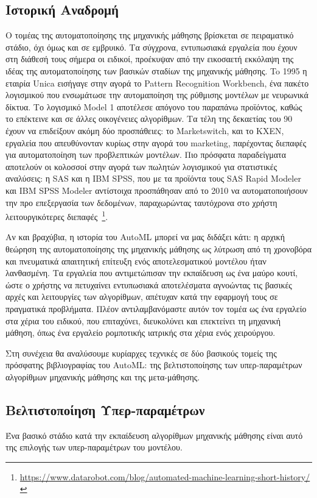  \subsection{Ιστορική Αναδρομή} \label{section:autohistory}
 Ο τομέας της αυτοματοποίησης της μηχανικής μάθησης βρίσκεται σε πειραματικό στάδιο, όχι όμως και σε εμβρυικό. Τα σύγχρονα, εντυπωσιακά εργαλεία που έχουν στη διάθεσή τους σήμερα οι ειδικοί, προέκυψαν από την εικοσαετή εκκόλαψη της ιδέας της αυτοματοποίησης των βασικών σταδίων της μηχανικής μάθησης. To 1995 η εταιρία Unica εισήγαγε στην αγορά το Pattern Recognition Workbench, ένα πακέτο λογισμικού
 που ενσωμάτωσε την αυτομαποίηση της ρύθμισης μοντέλων με νευρωνικά δίκτυα. Το λογισμικό Model 1 αποτέλεσε απόγονο του παραπάνω προϊόντος, καθώς το επέκτεινε και σε άλλες οικογένειες αλγορίθμων. Τα τέλη της δεκαετίας του 90 έχουν να επιδείξουν ακόμη δύο προσπάθειες: το Marketswitch, και το KXEN, εργαλεία που απευθύνονταν κυρίως στην αγορά του marketing, παρέχοντας διεπαφές για αυτοματοποίηση των προβλεπτικών μοντέλων. Πιο πρόσφατα παραδείγματα αποτελούν οι κολοσσοί στην αγορά των πωλητών λογισμικού για στατιστικές αναλύσεις: η SAS και η IBM SPSS, που με τα προϊόντα τους SAS Rapid Modeler και IBM SPSS Modeler αντίστοιχα προσπάθησαν από το 2010 να αυτοματοποιήσουν την προ επεξεργασία των δεδομένων, παραχωρώντας ταυτόχρονα στο χρήστη λειτουργικότερες διεπαφές~\footnote{\url{https://www.datarobot.com/blog/automated-machine-learning-short-history/}}.
 
 Αν και βραχύβια, η ιστορία του AutoML μπορεί να μας διδάξει κάτι: η αρχική θεώρηση της αυτοματοποίησης της μηχανικής μάθησης ως λύτρωση  από τη χρονοβόρα και πνευματικά απαιτητική επίτευξη ενός αποτελεσματικού μοντέλου ήταν λανθασμένη. Τα εργαλεία που αντιμετώπισαν την εκπαίδευση ως ένα μαύρο κουτί, ώστε ο χρήστης να πετυχαίνει εντυπωσιακά αποτελέσματα αγνοώντας τις βασικές αρχές και λειτουργίες των αλγορίθμων, απέτυχαν κατά την εφαρμογή τους σε πραγματικά προβλήματα. Πλέον αντιλαμβανόμαστε αυτόν τον τομέα ως ένα εργαλείο στα χέρια του ειδικού, που επιταχύνει, διευκολύνει και επεκτείνει τη μηχανική μάθηση, όπως ένα  εργαλείο ρομποτικής ιατρικής στα χέρια ενός χειρούργου. 
 
 Στη συνέχεια θα αναλύσουμε κυρίαρχες τεχνικές σε δύο βασικούς τομείς της πρόσφατης βιβλιογραφίας του AutoML: της βελτιστοποίησης των υπερ-παραμέτρων αλγορίθμων μηχανικής μάθησης και της μετα-μάθησης.
 
 \subsection{Βελτιστοποίηση Υπερ-παραμέτρων} \label{section:opt}
 	Ένα βασικό στάδιο κατά την εκπαίδευση αλγορίθμων μηχανικής μάθησης είναι αυτό της επιλογής των υπερ-παραμέτρων του μοντέλου.
 	
